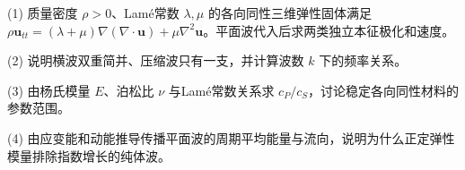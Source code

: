 (1) 质量密度 \(\rho>0\)、Lamé常数 \(\lambda,\mu\) 的各向同性三维弹性固体满足 \(\rho\mathbf u_{tt}=(\lambda+\mu)\nabla(\nabla\cdot\mathbf u)+\mu\nabla^2\mathbf u\)。平面波代入后求两类独立本征极化和速度。

(2) 说明横波双重简并、压缩波只有一支，并计算波数 \(k\) 下的频率关系。

(3) 由杨氏模量 \(E\)、泊松比 \(\nu\) 与Lamé常数关系求 \(c_P/c_S\)，讨论稳定各向同性材料的参数范围。

(4) 由应变能和动能推导传播平面波的周期平均能量与流向，说明为什么正定弹性模量排除指数增长的纯体波。
